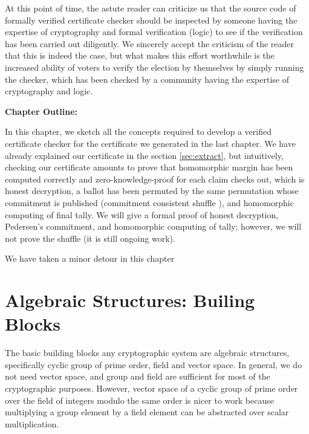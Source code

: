  
  
  At this point of time, the astute reader can criticize us that the source code of formally verified certificate checker should be 
  inspected by someone having the expertise of cryptography and formal verification (logic) 
  to see if the verification has been carried out diligently. We sincerely accept the criticism of the 
  reader that this is indeed the case, but what makes this effort  worthwhile is 
  the increased ability of voters to verify the election by themselves by 
  simply running the checker, which has been checked by a community having the 
  expertise of cryptography and logic. 

\textbf{Chapter Outline:} 



In this chapter, we sketch all the concepts required to develop a verified certificate checker for the certificate we generated 
in the last chapter.  We have already explained our certificate in the section \ref{sec:extract}, but intuitively, 
checking our certificate amounts to prove that  homomorphic margin has been computed correctly and zero-knowledge-proof for each claim checks out, which is honest decryption, 
a ballot has been permuted by the same permutation whose commitment is published (commitment consistent shuffle \citep{Wikstrom:2009:CPS}), and 
homomorphic computing of final tally.  We will give a formal proof of honest decryption, Pedersen's commitment, and homomorphic computing of 
tally; however, we will not prove the  shuffle (it is still ongoing work).  

We have taken a minor detour in this chapter 



\section{Algebraic Structures: Builing Blocks}
The basic building blocks any cryptographic system are algebraic structures, specifically cyclic group of prime order, field and vector space. In general, 
we do not need vector space, and group and field are sufficient for most of the cryptographic purposes. However,
vector space  of a cyclic group of prime order over the field of integers modulo the same order is nicer to work 
because multiplying a group element by a field element can be abstracted over scalar multiplication. 

